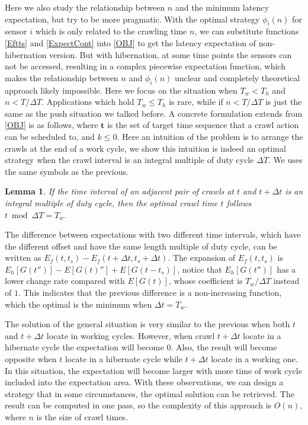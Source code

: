 \documentclass[conference]{IEEEtran}
\newtheorem{lemma}{Lemma}
\begin{document}
Here we also study the relationship between $n$ and the minimum latency expectation, but try to be more pragmatic.
With the optimal strategy $\phi_i(n)$ for sensor $i$ which is only related to the crawling time $n$, we can substitute functions \eqref{Eftts} and \eqref{ExpectCont} into \eqref{OBJ} to get the latency expectation of non-hibernation version. 
But with hibernation, at some time points the sensors can not be accessed, resulting in a complex piecewise expectation function, which makes the relationship between $n$ and $\phi_i(n)$ unclear and completely theoretical approach likely impossible.
Here we focus on the situation when $T_w<T_h$ and $n<T/\Delta T$. Applications which hold $T_w\leq T_h$ is rare, while if $n<T/\Delta T$ is just the same as the push situation we talked before.
A concrete formulation extends from \ref{OBJ} is as follows, where $\mathbf{t}$ is the set of target time sequence that a crawl action can be scheduled to, and $k\leq 0$.
Here an intuition of the problem is to arrange the crawls at the end of a work cycle, we show this intuition is indeed an optimal strategy when the crawl interval is an integral multiple of duty cycle $\Delta T$. We uses the same symbols as the previous.

\begin{lemma}
\label{intopt}
If the time interval of an adjacent pair of crawls at $t$ and $t+\Delta t$ is an integral multiple of duty cycle, then the optimal crawl time $t$ follows $t\bmod \Delta T=T_w$.
\end{lemma}

\begin{IEEEproof}
The difference between expectations with two different time intervals, which have the different offset and have the same length multiple of duty cycle, can be written as $E_f(t, t_s)-E_f(t+\Delta t, t_s+\Delta t)$. 
The expansion of $E_f(t,t_s)$ is $E_h[G(t'')]-E[G(t)'']+E[G(t-t_s)]$, notice that $E_h[G(t'')]$ has a lower change rate compared with $E[G(t)]$, whose coefficient is $T_w/\Delta T$ instead of $1$. This indicates that the previous difference is a non-increasing function, which the optimal is the minimum when $\Delta t =T_w$.
\end{IEEEproof}


The solution of the general situation is very similar to the previous when both $t$ and $t+\Delta t$ locate in working cycles. However, when crawl $t+\Delta t$  locate in a hibernate cycle the expectation will become $0$. Also, the result will become opposite when $t$ locate in a hibernate cycle while $t+\Delta t$ locate in a working one. In this situation, the expectation will become larger with more time of work cycle included into the expectation area. 
With these observations, we can design a strategy that in some circumstances, the optimal solution can be retrieved.
The result can be computed in one pass, so the complexity of this approach is $O(n)$, where $n$ is the size of crawl times.
\end{document}
